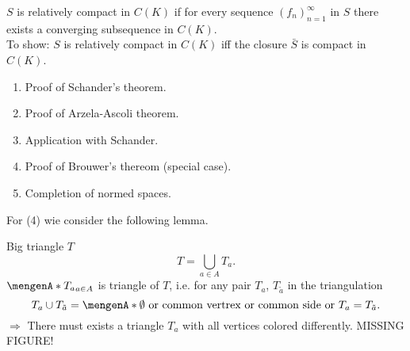 $S$ is relatively compact in $C(K)$ if for every sequence $(f_n)_{n=1}^{\infty}$ in $S$ there exists a converging subsequence in $C(K)$. \\
To show:
$S$ is relatively compact in $C(K)$ iff the closure $\bar{S}$ is compact in $C(K)$. 
\begin{enumerate}[(1)]
	\item Proof of Schander's theorem.
	\item Proof of Arzela-Ascoli theorem.
	\item Application with Schander.
	\item Proof of Brouwer's thereom (special case).
	\item Completion of normed spaces.
\end{enumerate}	
For (4) wie consider the following lemma.
\begin{lemma}
	Big triangle $T$ 
	\[
		T = \bigcup_{a \in A} T_a.
	\]
	$\set{T_a}_{a \in A}$ is triangle of $T$, i.e. for any pair $T_a$, $T_{\tilde a}$ in the triangulation
	\[
		T_a \cup T_{\tilde a}= \set{\emptyset \text{ or common vertrex or common side or }T_a = T_{\tilde a}}.
	\]
	$\Rightarrow $ There must exists a triangle $T_a$ with all vertices colored differently. MISSING FIGURE!
\end{lemma}

